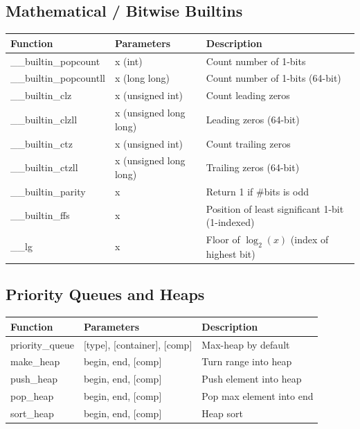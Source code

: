 \documentclass[10pt]{article}
\begin{document}
\begin{multicols*}{2}
\subsection*{Mathematical / Bitwise Builtins}
\begin{tabularx}{\linewidth}{|l|l|X|}
    \hline
    \textbf{Function} & \textbf{Parameters} & \textbf{Description} \\
    \hline
    \_\_builtin\_popcount & x (int) & Count number of 1-bits \\
    \hline
    \_\_builtin\_popcountll & x (long long) & Count number of 1-bits (64-bit) \\
    \hline
    \_\_builtin\_clz & x (unsigned int) & Count leading zeros \\
    \hline
    \_\_builtin\_clzll & x (unsigned long long) & Leading zeros (64-bit) \\
    \hline
    \_\_builtin\_ctz & x (unsigned int) & Count trailing zeros \\
    \hline
    \_\_builtin\_ctzll & x (unsigned long long) & Trailing zeros (64-bit) \\
    \hline
    \_\_builtin\_parity & x & Return 1 if \#bits is odd \\
    \hline
    \_\_builtin\_ffs & x & Position of least significant 1-bit (1-indexed) \\
    \hline
    \_\_lg & x & Floor of $\log_2(x)$ (index of highest bit) \\
    \hline
\end{tabularx}

\subsection*{Priority Queues and Heaps}
\begin{tabularx}{\linewidth}{|l|l|X|}
    \hline
    \textbf{Function} & \textbf{Parameters} & \textbf{Description} \\
    \hline
    priority\_queue & [type], [container], [comp] & Max-heap by default \\
    \hline
    make\_heap & begin, end, [comp] & Turn range into heap \\
    \hline
    push\_heap & begin, end, [comp] & Push element into heap \\
    \hline
    pop\_heap & begin, end, [comp] & Pop max element into end \\
    \hline
    sort\_heap & begin, end, [comp] & Heap sort \\
    \hline
\end{tabularx}


\end{multicols*}
\end{document}

